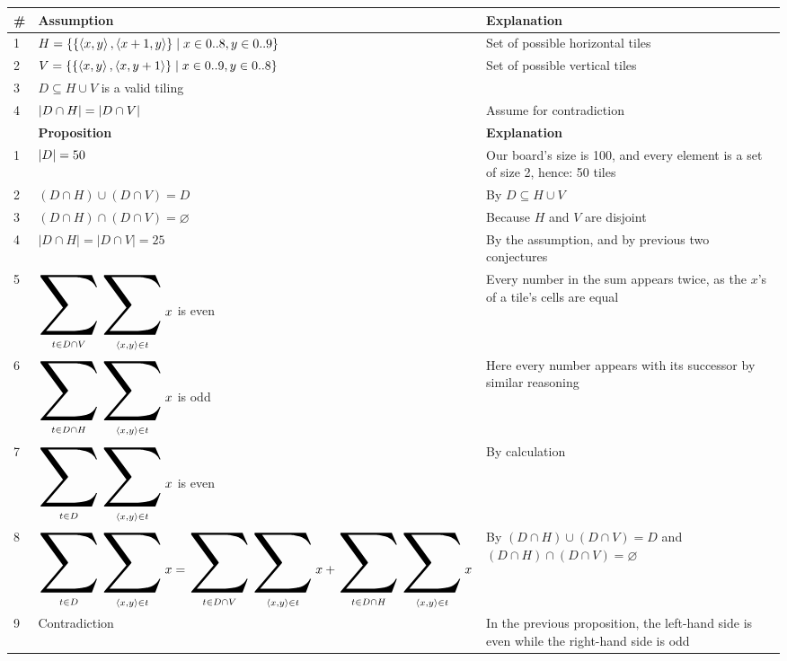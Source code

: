 {

\let\oldsum\sum
\renewcommand{\sum}{%
    \mathop{\scalebox{1.5}{$\displaystyle\oldsum$}}\limits
}

\newcommand{\sumDwhat}[1]{
    \sum_{t \in D \cap #1} \sum_{ \tup{x, y} \in t } x
}
\newcommand{\sumDV}{\sumDwhat V}
\newcommand{\sumDH}{\sumDwhat H}
\newcommand{\sumD}{
    \sum_{t \in D} \sum_{ \tup{x, y} \in t } x
}

\begin{tabular}{|p{0.25cm}|p{7cm}|p{8cm}|}
    \hline
    \# & \textbf{Assumption} & \textbf{Explanation} \\
    \hline
    \hline
    1 &
    $
    H = \left\{  \left\{  \left\langle x, y \right\rangle, \left\langle x + 1, y \right\rangle  \right\} \mid x \in 0..8, y \in 0..9  \right\}
    $ &
        Set of possible horizontal tiles \\
    \hline
    2 &
    $
    V = \left\{  \left\{  \left\langle x, y \right\rangle, \left\langle x, y + 1 \right\rangle  \right\} \mid x \in 0..9, y \in 0..8  \right\}
    $ &
        Set of possible vertical tiles \\
    \hline
    3 &
    $D \subseteq H \cup V$ is a valid tiling & \\
    \hline
    4 &
    $\left| D \cap H \right| = \left| D \cap V \right|$ & Assume for contradiction \\
    \hline
    & \textbf{Proposition} & \textbf{Explanation} \\
    \hline
    1 &
    $\left| D \right| = 50$ &
        Our board's size is 100, and every element is a set of size 2, hence: 50 tiles \\
    \hline
    2 &
    $(D \cap H) \cup (D \cap V) = D$ &
        By $D \subseteq H \cup V$ \\
    \hline
    3 &
    $(D \cap H) \cap (D \cap V) = \varnothing$ &
        Because $H$ and $V$ are disjoint \\
    \hline
    4 &
    $|D \cap H| = |D \cap V| = 25$ &
        By the assumption, and by previous two conjectures \\
    \hline
    5 &
    $\sumDV$ is even &
        Every number in the sum appears twice, as the $x$'s of a tile's cells are equal \\
    \hline
    6 &
    $\sumDH$ is odd &
        Here every number appears with its successor by similar reasoning \\
    \hline
    7 &
    $\sumD$ is even &
        By calculation \\
    \hline
    8 &
    $\sumD = \sumDV + \sumDH$ &
        By $(D \cap H) \cup (D \cap V) = D$ and $(D \cap H) \cap (D \cap V) =
        \varnothing$ \\
    \hline
    9 &
    Contradiction & In the previous proposition, the left-hand side is even
    while the right-hand side is odd \\
    \hline
\end{tabular}

}
